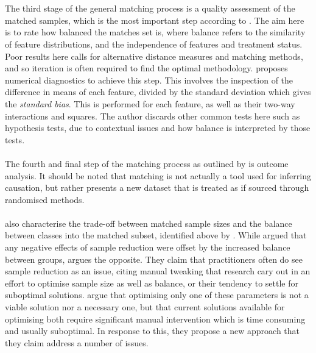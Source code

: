 {{\\\\
The third stage of the general matching process is a quality assessment of the matched samples, which is the most important step according to \cite{stuart2010matching}. The aim here is to rate how balanced the matches set is, where balance refers to the similarity of feature distributions, and the independence of features and treatment status. Poor results here calls for alternative distance measures and matching methods, and so iteration is often required to find the optimal methodology. \cite{stuart2010matching} proposes numerical diagnostics to achieve this step. This involves the inspection of the difference in means of each feature, divided by the standard deviation which gives the {\it standard bias}. This is performed for each feature, as well as their two-way interactions and squares. The author discards other common tests here such as hypothesis tests, due to contextual issues and how balance is interpreted by those tests. 
 \\\\ 
The fourth and final step of the matching process as outlined by \cite{stuart2010matching} is outcome analysis. It should be noted that matching is not actually a tool used for inferring causation, but rather presents a new dataset that is treated as if sourced through randomised methods.  
\\\\
\cite{king2014balance} also characterise the trade-off between matched sample sizes and the balance between classes into the matched subset, identified above by \cite{stuart2010matching}. While \cite{stuart2010matching} argued that any negative effects of sample reduction were offset by the increased balance between groups, \cite{king2014balance} argues the opposite. They claim that practitioners often do see sample reduction as an issue, citing manual tweaking that research cary out in an effort to optimise sample size as well as balance, or their tendency to settle for suboptimal solutions. \cite{king2014balance} argue that optimising only one of these parameters is not a viable solution nor a necessary one, but that current solutions available for optimising both require significant manual intervention which is time consuming and usually suboptimal. In response to this, they propose a new approach that they claim address a number of issues. \\\\
}}

